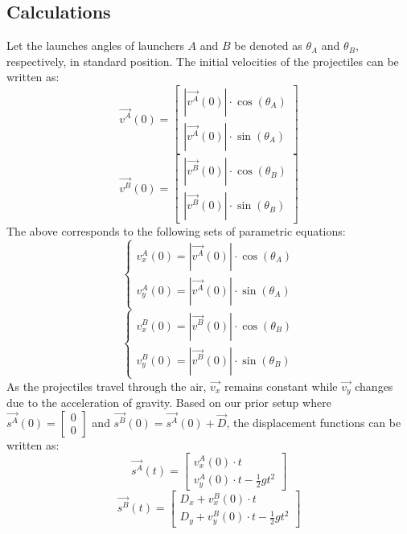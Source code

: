 \documentclass[12pt]{article}
\begin{document}
\subsection{Calculations}
Let the launches angles of launchers $A$ and $B$ be denoted as $\theta_A$ and $\theta_B$, respectively, in standard position. The initial velocities of the projectiles can be written as:
\[
\vec{v^A}(0) = \begin{bmatrix} |\vec{v^A}(0)| \cdot \cos(\theta_A) \\ |\vec{v^A}(0)| \cdot \sin(\theta_A) \end{bmatrix}
\]
\[
\vec{v^B}(0) = \begin{bmatrix} |\vec{v^B}(0)| \cdot \cos(\theta_B) \\ |\vec{v^B}(0)| \cdot \sin(\theta_B) \end{bmatrix}
\]
The above corresponds to the following sets of parametric equations:
\[
\begin{cases}
    v_x^A(0) = |\vec{v^A}(0)| \cdot \cos(\theta_A) \\
    v_y^A(0) = |\vec{v^A}(0)| \cdot \sin(\theta_A)
\end{cases}
\]
\[
\begin{cases}
    v_x^B(0) = |\vec{v^B}(0)| \cdot \cos(\theta_B) \\
    v_y^B(0) = |\vec{v^B}(0)| \cdot \sin(\theta_B)
\end{cases}
\]
As the projectiles travel through the air, \(\vec{v_x}\) remains constant while \(\vec{v_y}\) changes due to the acceleration of gravity. Based on our prior setup where \(\vec{s^A}(0) = \begin{bmatrix} 0 \\ 0 \end{bmatrix}\) and \(\vec{s^B}(0) = \vec{s^A}(0) + \vec{D}\), the displacement functions can be written as:
\[
\vec{s^A}(t) = \begin{bmatrix} v_x^A(0) \cdot t \\ v_y^A(0) \cdot t - \frac{1}{2} g t^2 \end{bmatrix}
\]
\[
\vec{s^B}(t) = \begin{bmatrix} D_x + v_x^B(0) \cdot t \\ D_y + v_y^B(0) \cdot t - \frac{1}{2} g t^2 \end{bmatrix}
\]
\end{document}
